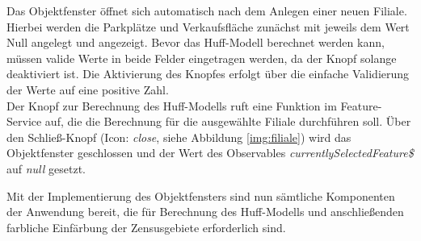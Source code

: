 Das Objektfenster öffnet sich automatisch nach dem Anlegen einer neuen Filiale.
Hierbei werden die Parkplätze und Verkaufsfläche zunächst mit jeweils dem Wert Null angelegt und angezeigt.
Bevor das Huff-Modell berechnet werden kann, müssen valide Werte in beide Felder eingetragen werden, da der Knopf solange deaktiviert ist.
Die Aktivierung des Knopfes erfolgt über die einfache Validierung der Werte auf eine positive Zahl.\\
Der Knopf zur Berechnung des Huff-Modells ruft eine Funktion im Feature-Service auf, die die Berechnung für die ausgewählte Filiale durchführen soll.
Über den Schließ-Knopf (Icon: \emph{close}, siehe Abbildung \ref{img:filiale}) wird das Objektfenster geschlossen und der Wert des Observables \emph{currentlySelectedFeature\$} auf \emph{null} gesetzt.

Mit der Implementierung des Objektfensters sind nun sämtliche Komponenten der Anwendung bereit, die für Berechnung des Huff-Modells und anschließenden farbliche Einfärbung der Zensusgebiete erforderlich sind.

